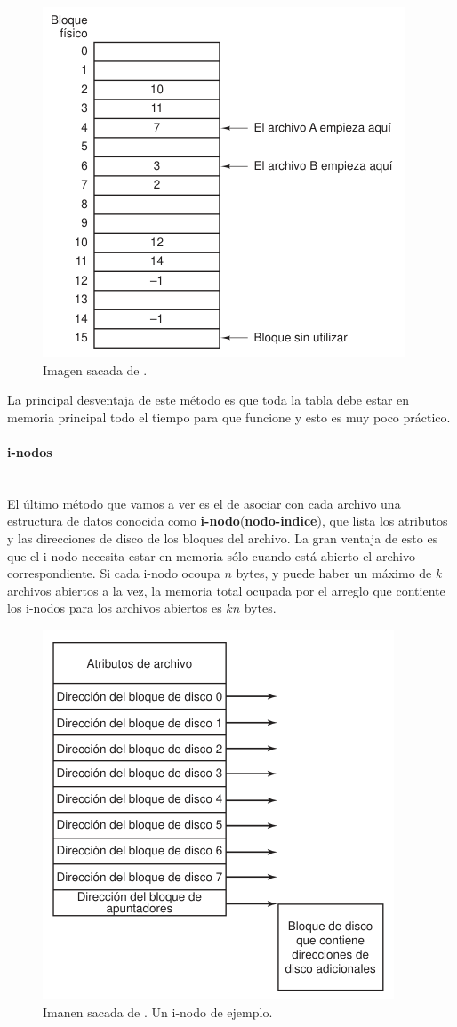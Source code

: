 \documentclass[12pt]{article}
\begin{document}
  \begin{figure}[H]
    \centering
    \includegraphics[width=0.5\linewidth]{imagenes/asign-lista-enlazada-tabla.png}
      \caption{Imagen sacada de \parencite{tanenbaum}.}
    \label{fig:asign-lista-enlazada-tabla}
  \end{figure}

  La principal desventaja de este método es que toda la tabla debe estar en memoria principal todo el tiempo para que funcione y esto es muy poco práctico.

  \paragraph{i-nodos}\mbox{}\\
  El último método que vamos a ver es el de asociar con cada archivo una estructura de datos conocida como \textbf{i-nodo}(\textbf{nodo-indice}), que lista los atributos y las direcciones de disco de los bloques del archivo. La gran ventaja de esto es que el i-nodo necesita estar en memoria sólo cuando está abierto el archivo correspondiente. Si cada i-nodo ocoupa $ n $ bytes, y puede haber un máximo de $ k $ archivos abiertos a la vez, la memoria total ocupada por el arreglo que contiente los i-nodos para los archivos abiertos es $ kn $ bytes.

  \begin{figure}[H]
    \centering
    \includegraphics[width=0.5\linewidth]{imagenes/i-nodo.png}
    \caption{Imanen sacada de \parencite{tanenbaum}. Un i-nodo de ejemplo.}
    \label{fig:i-nodo}
  \end{figure}
  
\end{document}
